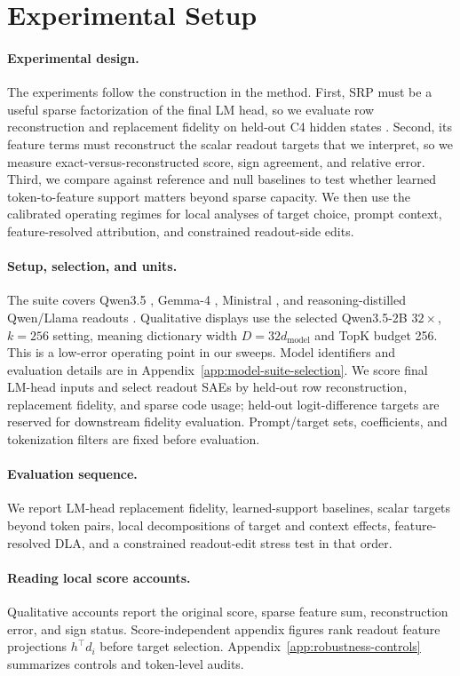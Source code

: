\section{Experimental Setup}
\label{sec:experimental-setup}

\paragraph{Experimental design.}
The experiments follow the construction in the method. First, SRP must be a
useful sparse factorization of the final LM head, so we evaluate row
reconstruction and replacement fidelity on held-out C4 hidden states
\citep{raffel2020exploring,dodge2021documenting}. Second, its feature terms
must reconstruct the scalar readout targets that we interpret, so we measure
exact-versus-reconstructed score, sign agreement, and relative error. Third, we
compare against reference and null baselines to test whether learned
token-to-feature support matters beyond sparse capacity. We then use the
calibrated operating regimes for local analyses of target choice, prompt
context, feature-resolved attribution, and constrained readout-side edits.

\paragraph{Setup, selection, and units.}
The suite covers Qwen3.5 \citep{qwen35collection}, Gemma-4
\citep{gemma4official,gemma4collection}, Ministral \citep{liu2026ministral3},
and reasoning-distilled Qwen/Llama readouts \citep{deepseekai2025deepseekr1}.
Qualitative displays use the selected Qwen3.5-2B \(32\times\), \(k=256\)
setting, meaning dictionary width \(D=32d_{\mathrm{model}}\) and TopK budget
256. This is a low-error operating point in our sweeps. Model identifiers and
evaluation details are in Appendix~\ref{app:model-suite-selection}. We score
final LM-head inputs and select readout SAEs by held-out row reconstruction,
replacement fidelity, and sparse code usage; held-out logit-difference targets
are reserved for downstream fidelity evaluation. Prompt/target sets,
coefficients, and tokenization filters are fixed before evaluation.

\paragraph{Evaluation sequence.}
We report LM-head replacement fidelity, learned-support baselines, scalar
targets beyond token pairs, local decompositions of target and context effects,
feature-resolved DLA, and a constrained readout-edit stress test in that order.

\paragraph{Reading local score accounts.}
Qualitative accounts report the original score, sparse feature sum,
reconstruction error, and sign status. Score-independent appendix figures rank
readout feature projections \(h^\top d_i\) before target selection.
Appendix~\ref{app:robustness-controls} summarizes controls and token-level
audits.
